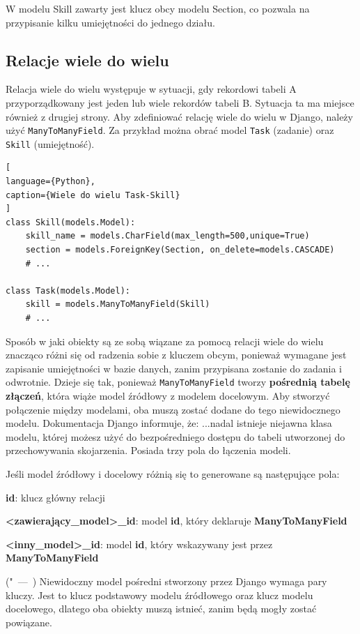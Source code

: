 \documentclass[oneside,polski,logo,indent]{amuthesis}
\let\oldquote\quote
\let\endoldquote\endquote
\renewenvironment{quote}[2][]
  {\if\relax\detokenize{#1}\relax
     \def\quoteauthor{#2}%
   \else
     \def\quoteauthor{#2~---~#1}%
   \fi
   \oldquote}
  {\par\nobreak\smallskip\hfill(\quoteauthor)%
   \endoldquote\addvspace{\bigskipamount}}
\begin{document}
W modelu Skill zawarty jest klucz obcy modelu Section, co pozwala na przypisanie kilku umiejętności do jednego działu.

\begin{center}
\subsection{Relacje wiele do wielu}
\end{center}
Relacja wiele do wielu występuje w sytuacji, gdy rekordowi tabeli A przyporządkowany jest jeden lub wiele rekordów tabeli B. Sytuacja ta ma miejsce również z drugiej strony.
Aby zdefiniować relację wiele do wielu w Django, należy użyć \texttt{ManyToManyField}. Za przykład można obrać model \texttt{Task} (zadanie) oraz \texttt{Skill} (umiejętność).
\begin{lstlisting}[
language={Python},
caption={Wiele do wielu Task-Skill}
]
class Skill(models.Model):
    skill_name = models.CharField(max_length=500,unique=True)
    section = models.ForeignKey(Section, on_delete=models.CASCADE)
	# ...

class Task(models.Model):
    skill = models.ManyToManyField(Skill)
	# ...
\end{lstlisting}

Sposób w jaki obiekty są ze sobą wiązane za pomocą relacji wiele do wielu znacząco różni się od radzenia sobie z kluczem obcym, ponieważ wymagane jest zapisanie umiejętności w bazie danych, zanim przypisana zostanie do zadania i odwrotnie. Dzieje się tak, ponieważ \texttt{ManyToManyField} tworzy \textbf{pośrednią tabelę złączeń}, która wiąże model źródłowy z modelem docelowym. Aby stworzyć połączenie między modelami, oba muszą zostać dodane do tego niewidocznego modelu. Dokumentacja Django informuje, że:
\begin{quote}
"...nadal istnieje niejawna klasa modelu, której możesz użyć do bezpośredniego dostępu do tabeli utworzonej do przechowywania skojarzenia. Posiada trzy pola do łączenia modeli.

Jeśli model źródłowy i docelowy różnią się to generowane są następujące pola:

\textbf{id}: klucz główny relacji

\textbf{<zawierający\_model>\_id}: model \textbf{id}, który deklaruje \textbf{ManyToManyField}

\textbf{<inny\_model>\_id}: model \textbf{id}, który wskazywany jest przez \textbf{ManyToManyField}
\end{quote}
Niewidoczny model pośredni stworzony przez Django wymaga pary kluczy. Jest to klucz podstawowy modelu źródłowego oraz klucz modelu docelowego, dlatego oba obiekty muszą istnieć, zanim będą mogły zostać powiązane.
\end{document}
